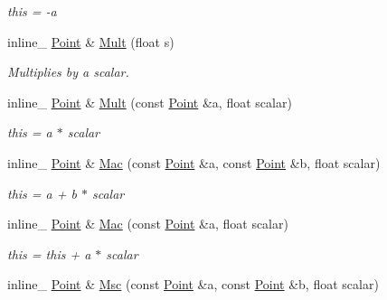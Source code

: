 \begin{DoxyCompactItemize}
\begin{DoxyCompactList}\small\item\em this = -\/a \end{DoxyCompactList}\item 
inline\+\_\+ \hyperlink{classOpcode_1_1Point}{Point} \& \hyperlink{classOpcode_1_1Point_a21a1ce331bea647964a6251454e82d02}{Mult} (float s)\hypertarget{classOpcode_1_1Point_a21a1ce331bea647964a6251454e82d02}{}\label{classOpcode_1_1Point_a21a1ce331bea647964a6251454e82d02}

\begin{DoxyCompactList}\small\item\em Multiplies by a scalar. \end{DoxyCompactList}\item 
inline\+\_\+ \hyperlink{classOpcode_1_1Point}{Point} \& \hyperlink{classOpcode_1_1Point_a5fc73ce359c97f46364f2b3870c0fcfd}{Mult} (const \hyperlink{classOpcode_1_1Point}{Point} \&a, float scalar)\hypertarget{classOpcode_1_1Point_a5fc73ce359c97f46364f2b3870c0fcfd}{}\label{classOpcode_1_1Point_a5fc73ce359c97f46364f2b3870c0fcfd}

\begin{DoxyCompactList}\small\item\em this = a $\ast$ scalar \end{DoxyCompactList}\item 
inline\+\_\+ \hyperlink{classOpcode_1_1Point}{Point} \& \hyperlink{classOpcode_1_1Point_a07928a9fe67292052f1f4b8863fb6eb6}{Mac} (const \hyperlink{classOpcode_1_1Point}{Point} \&a, const \hyperlink{classOpcode_1_1Point}{Point} \&b, float scalar)\hypertarget{classOpcode_1_1Point_a07928a9fe67292052f1f4b8863fb6eb6}{}\label{classOpcode_1_1Point_a07928a9fe67292052f1f4b8863fb6eb6}

\begin{DoxyCompactList}\small\item\em this = a + b $\ast$ scalar \end{DoxyCompactList}\item 
inline\+\_\+ \hyperlink{classOpcode_1_1Point}{Point} \& \hyperlink{classOpcode_1_1Point_a062d2009a7dd5b8112e30cdf593f0d44}{Mac} (const \hyperlink{classOpcode_1_1Point}{Point} \&a, float scalar)\hypertarget{classOpcode_1_1Point_a062d2009a7dd5b8112e30cdf593f0d44}{}\label{classOpcode_1_1Point_a062d2009a7dd5b8112e30cdf593f0d44}

\begin{DoxyCompactList}\small\item\em this = this + a $\ast$ scalar \end{DoxyCompactList}\item 
inline\+\_\+ \hyperlink{classOpcode_1_1Point}{Point} \& \hyperlink{classOpcode_1_1Point_a4f3857dc946cb0234595549a57dd13ae}{Msc} (const \hyperlink{classOpcode_1_1Point}{Point} \&a, const \hyperlink{classOpcode_1_1Point}{Point} \&b, float scalar)\hypertarget{classOpcode_1_1Point_a4f3857dc946cb0234595549a57dd13ae}{}\label{classOpcode_1_1Point_a4f3857dc946cb0234595549a57dd13ae}


\end{DoxyCompactItemize}

